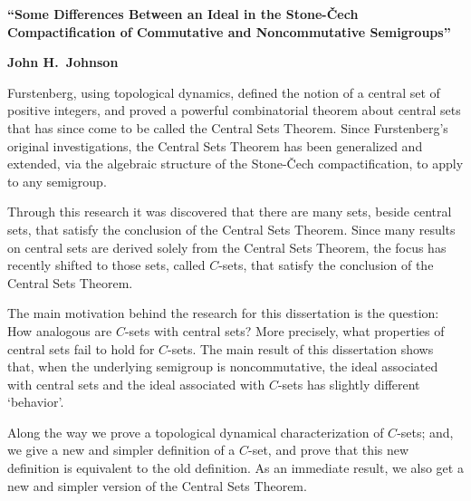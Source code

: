 \documentclass[12pt]{article}
\begin{document}
  \begin{center}
    \textbf{``Some Differences Between an Ideal in the Stone-\v{C}ech Compactification of Commutative and Noncommutative Semigroups''}
    \vspace{3em}

    \textbf{John H.~Johnson}
    \vspace{3em}
  \end{center}

Furstenberg, using topological dynamics, defined the notion of a central set of positive integers, and proved a powerful combinatorial theorem about central sets that has since come to be called the Central Sets Theorem.
Since Furstenberg's original investigations, the Central Sets Theorem has been generalized and extended, via the algebraic structure of the Stone-\v{C}ech compactification, to apply to any semigroup.

Through this research it was discovered that there are many sets, beside central sets, that satisfy the conclusion of the Central Sets Theorem.
Since many results on central sets are derived solely from the Central Sets Theorem, the focus has recently shifted to those sets, called $C$-sets, that satisfy the conclusion of the Central Sets Theorem.

The main motivation behind the research for this dissertation is the question: How analogous are $C$-sets with central sets?
More precisely, what properties of central sets fail to hold for $C$-sets.
The main result of this dissertation shows that, when the underlying semigroup is noncommutative, the ideal associated with central sets and the ideal associated with $C$-sets has slightly different `behavior'.  

Along the way we prove a topological dynamical characterization of $C$-sets; and, we give a new and simpler definition of a $C$-set, and prove that this new definition is equivalent to the old definition.
As an immediate result, we also get a new and simpler version of the Central Sets Theorem.
\end{document}

